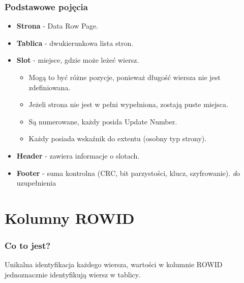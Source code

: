 \documentclass[a4paper,twoside]{article}
\begin{document}
  	\section*{Podstawowe pojęcia}
  	\begin{itemize}
  		\item \textbf{Strona} - Data Row Page.
  		\item \textbf{Tablica} - dwukierunkowa lista stron.
  		\item \textbf{Slot} - miejsce, gdzie może leżeć wiersz.
  		\begin{itemize}
  			\item Mogą to być różne pozycje, ponieważ długość wiersza nie jest zdefiniowana.
  			\item Jeżeli strona nie jest w pełni wypełniona, zostają puste miejsca.
  			\item Są numerowane, każdy posida Update Number.
  			\item Każdy posiada wskaźnik do extentu (osobny typ strony).
  		\end{itemize}
  		\item \textbf{Header} - zawiera informacje o slotach.
  		\item \textbf{Footer} - suma kontrolna (CRC, bit parzystości, klucz, szyfrowanie). \emph do uzupełnienia
  	\end{itemize}
  	
  	\part*{Kolumny ROWID}
  	\section*{Co to jest?}
  	Unikalna identyfikacja każdego wiersza, wartości w kolumnie ROWID jednoznacznie identyfikują wiersz w tablicy.
  	
\end{document}
